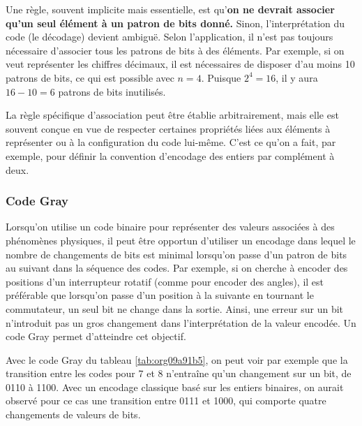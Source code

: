 \documentclass[11pt]{article}
\begin{document}
Une règle, souvent implicite mais essentielle, est qu'\textbf{on
ne devrait associer qu'un seul élément à un patron de bits donné.}
Sinon, l'interprétation du code (le décodage) devient ambiguë. Selon
l'application, il n'est pas toujours nécessaire d'associer tous les
patrons de bits à des éléments. Par exemple, si on veut représenter
les chiffres décimaux, il est nécessaires de disposer d'au moins 10
patrons de bits, ce qui est possible avec \(n=4\). Puisque \(2^4 =
16\), il y aura \(16 - 10 = 6\) patrons de bits inutilisés.

La règle spécifique d'association peut être établie arbitrairement,
mais elle est souvent conçue en vue de respecter certaines propriétés
liées aux éléments à représenter ou à la configuration du code
lui-même. C'est ce qu'on a fait, par exemple, pour définir la
convention d'encodage des entiers par complément à deux.

\subsubsection{Code Gray}
\label{sec:org7d1d09e}

Lorsqu'on utilise un code binaire pour représenter des valeurs
associées à des phénomènes physiques, il peut être opportun d’utiliser
un encodage dans lequel le nombre de changements de bits est minimal
lorsqu'on passe d'un patron de bits au suivant dans la séquence des
codes. Par exemple, si on cherche à encoder des positions d'un
interrupteur rotatif (comme pour encoder des angles), il est
préférable que lorsqu'on passe d'un position à la suivante en tournant
le commutateur, un seul bit ne change dans la sortie. Ainsi, une
erreur sur un bit n'introduit pas un gros changement dans
l'interprétation de la valeur encodée. Un code Gray permet d'atteindre
cet objectif.

Avec le code Gray du tableau \ref{tab:org09a91b5}, on peut voir par exemple que la
transition entre les codes pour 7 et 8 n’entraîne qu'un changement sur
un bit, de 0110 à 1100. Avec un encodage classique basé sur les
entiers binaires, on aurait observé pour ce cas une transition entre
0111 et 1000, qui comporte quatre changements de valeurs de bits.
\end{document}
